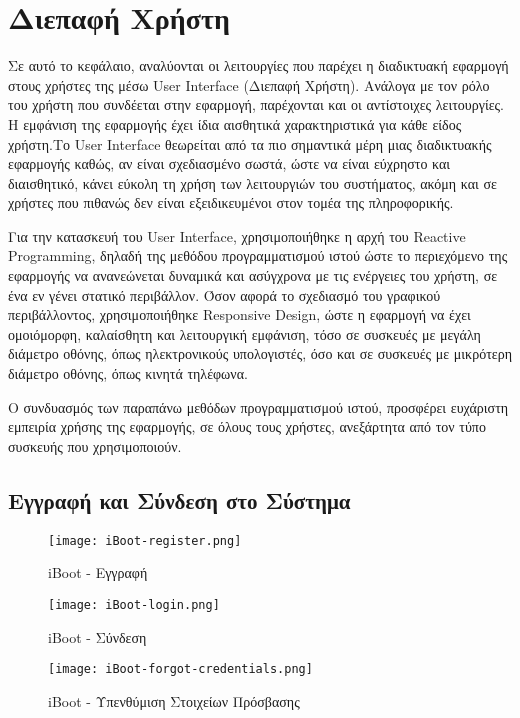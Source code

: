 \chapter{Διεπαφή Χρήστη}
Σε αυτό το κεφάλαιο, αναλύονται οι λειτουργίες που παρέχει η διαδικτυακή εφαρμογή στους χρήστες της μέσω User Interface (Διεπαφή Χρήστη). Ανάλογα με τον ρόλο του χρήστη που συνδέεται στην εφαρμογή, παρέχονται και οι αντίστοιχες λειτουργίες. Η εμφάνιση της εφαρμογής έχει ίδια αισθητικά χαρακτηριστικά για κάθε είδος χρήστη.Το User Interface θεωρείται από τα πιο σημαντικά μέρη μιας διαδικτυακής εφαρμογής καθώς, αν είναι σχεδιασμένο σωστά, ώστε να είναι εύχρηστο και διαισθητικό, κάνει εύκολη τη χρήση των λειτουργιών του συστήματος, ακόμη και σε χρήστες που πιθανώς δεν είναι εξειδικευμένοι στον τομέα της πληροφορικής.

Για την κατασκευή του User Interface, χρησιμοποιήθηκε η αρχή του Reactive Programming, δηλαδή της μεθόδου προγραμματισμού ιστού ώστε το περιεχόμενο της εφαρμογής να ανανεώνεται δυναμικά και ασύγχρονα με τις ενέργειες του χρήστη, σε ένα εν γένει στατικό περιβάλλον. Όσον αφορά το σχεδιασμό του γραφικού περιβάλλοντος, χρησιμοποιήθηκε Responsive Design, ώστε η εφαρμογή να έχει ομοιόμορφη, καλαίσθητη και λειτουργική εμφάνιση, τόσο σε συσκευές με μεγάλη διάμετρο οθόνης, όπως ηλεκτρονικούς υπολογιστές, όσο και σε συσκευές με μικρότερη διάμετρο οθόνης, όπως κινητά τηλέφωνα.

Ο συνδυασμός των παραπάνω μεθόδων προγραμματισμού ιστού, προσφέρει ευχάριστη εμπειρία χρήσης της εφαρμογής, σε όλους τους χρήστες, ανεξάρτητα από τον τύπο συσκευής που χρησιμοποιούν.

\section{Εγγραφή και Σύνδεση στο Σύστημα}

\FloatBarrier

\begin{figure}[h]
	\centering
	\texttt{[image: iBoot-register.png]}
	\caption{iBoot - Εγγραφή}
	\label{fig:iBoot_register}
\end{figure}

\begin{figure}[h]
	\centering
	\texttt{[image: iBoot-login.png]}
	\caption{iBoot - Σύνδεση}
	\label{fig:iBoot_login}
\end{figure}

\begin{figure}[h]
	\centering
	\texttt{[image: iBoot-forgot-credentials.png]}
	\caption{iBoot - Υπενθύμιση Στοιχείων Πρόσβασης}
	\label{fig:iBoot_forgot_credentials}
\end{figure}

